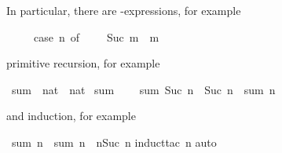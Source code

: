 %
\begin{isabellebody}%
\def\isabellecontext{natsum}%
%
\isadelimtheory
%
\endisadelimtheory
%
\isatagtheory
%
\endisatagtheory
{\isafoldtheory}%
%
\isadelimtheory
%
\endisadelimtheory
%
\begin{isamarkuptext}%
\noindent
In particular, there are -expressions, for example
\begin{isabelle}%
\ \ \ \ \ case\ n\ of\ {}\ {}\ {}\ {}\ Suc\ m\ {}\ m%
\end{isabelle}
primitive recursion, for example%
\end{isamarkuptext}%
\isamarkuptrue%
\isamarkupfalse%
\ sum\ {}{}\ {}nat\ {}\ nat{}\ \isanewline
{}sum\ {}\ {}\ {}{}\ {}\isanewline
{}sum\ {}Suc\ n{}\ {}\ Suc\ n\ {}\ sum\ n{}%
\begin{isamarkuptext}%
\noindent
and induction, for example%
\end{isamarkuptext}%
\isamarkuptrue%
\isamarkupfalse%
\ {}sum\ n\ {}\ sum\ n\ {}\ n{}{}Suc\ n{}{}\isanewline
%
\isadelimproof
%
\endisadelimproof
%
\isatagproof
{}\isamarkupfalse%
{}induct{}tac\ n{}\isanewline
{}\isamarkupfalse%
{}auto{}\isanewline
{}\isamarkupfalse%
%
\endisatagproof
{\isafoldproof}%
%
\isadelimproof
%
\endisadelimproof
%
\begin{isamarkuptext}%
\newcommand{\mystar}{*%
}
\end{isamarkuptext}
\end{isabellebody}
